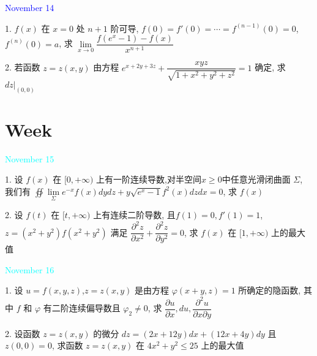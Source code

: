 \textcolor{blue}{November 14}

1. $f(x)$ 在 $x=0$ 处 $n+1$ 阶可导, $f(0)=f'(0)=\cdots=f^{(n-1)}(0)=0$,$f^{(n)}(0)=a$,
求 $\lim\limits_{x\to 0}\dfrac{f(e^{x}-1)-f(x)}{x^{n+1}}$
\begin{solution}
	
\end{solution}

2. 若函数 $z=z(x,y)$ 由方程 $\displaystyle{e^{x+2y+3z}+\dfrac{xyz}{\sqrt{1+x^2+y^2+z^2}}=1}$ 确定, 求 $dz|_{(0,0)}$
\begin{solution}
	
\end{solution}

\section{Week }
\textcolor{cyan}{November 15}

1. 设 $f(x)$ 在 $[0,+\infty)$ 上有一阶连续导数,对半空间$x\geq 0$中任意光滑闭曲面 $\varSigma$, 
我们有 $\oiint\lim\limits_{\varSigma}e^{-x}f(x)dydz+y\sqrt{e^{x}-1}f^{2}(x)dzdx=0$, 求 $f(x)$
\begin{solution}
	
\end{solution}

2. 设 $f(t)$ 在 $[t,+\infty)$ 上有连续二阶导数, 且$f(1)=0,f'(1)=1$,$z=(x^2+y^2)f(x^2+y^2)$ 
满足 $\dfrac{\partial^2 z}{\partial x^2}+\dfrac{\partial^2 z}{\partial y^2}=0$, 求 $f(x)$ 
在 $[1,+\infty)$ 上的最大值
\begin{solution}
	
\end{solution}

\textcolor{cyan}{November 16}

1. 设 $u=f(x,y,z)$,$z=z(x,y)$ 是由方程 $\varphi(x+y,z)=1$ 所确定的隐函数,
其中 $f$ 和 $\varphi$ 有二阶连续偏导数且 $\varphi_{2}\neq 0$,
求 $\dfrac{\partial u}{\partial x},du,\dfrac{\partial^2 u}{\partial x\partial y}$
\begin{solution}
	
\end{solution}

2. 设函数 $z=z(x,y)$ 的微分 $dz=(2x+12y)dx+(12x+4y)dy$ 且 $z(0,0)=0$,
求函数 $z=z(x,y)$ 在 $4x^2+y^2\leq 25$ 上的最大值
\begin{solution}
	
\end{solution}

